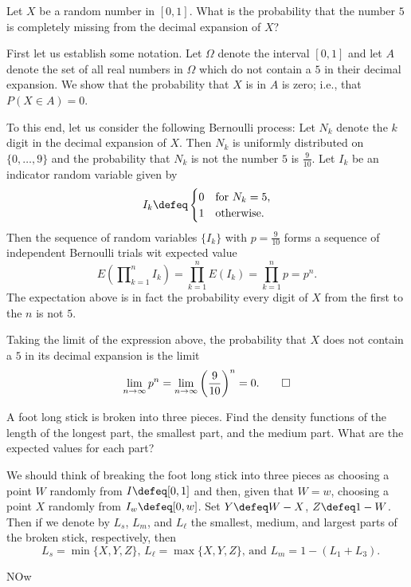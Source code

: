 \begin{problem}[Handout 18, \# 16]
  Let \(X\) be a random number in \([0,1]\). What is the probability that
  the number \(5\) is completely missing from the decimal expansion of
  \(X\)?
\end{problem}
\begin{solution}
  First let us establish some notation. Let \(\Omega\) denote the interval
  \([0,1]\) and let \(A\) denote the set of all real numbers in \(\Omega\)
  which do not contain a \(5\) in their decimal expansion. We show that the
  probability that \(X\) is in \(A\) is zero; i.e., that \(P(X\in A)=0\).

  To this end, let us consider the following Bernoulli process: Let \(N_k\)
  denote the \(k\) digit in the decimal expansion of
  \(X\). Then \(N_k\) is uniformly distributed on \(\{0,\dotsc,9\}\) and
  the probability that \(N_k\) is not the number \(5\) is
  \(\frac{9}{10}\). Let \(I_k\) be an indicator random variable given by
  \[
    I_k\defeq%
    \begin{cases}%
      0&\text{for \(N_k=5\),}\\
      1&\text{otherwise.}
    \end{cases}
  \]
  Then the sequence of random variables \(\{I_k\}\) with \(p=\frac{9}{10}\)
  forms a sequence of independent Bernoulli trials wit expected value
  \[
    E\left(\prod\nolimits_{k=1}^n I_k\right)=%
    \prod_{k=1}^n E(I_k)=%
    \prod_{k=1}^n p=p^n.
  \]
  The expectation above is in fact the probability every digit of \(X\)
  from the first to the \(n\) is not \(5\).

  Taking the limit of the expression above, the probability that \(X\) does
  not contain a \(5\) in its decimal expansion is the limit
  \[
    \lim_{n\to\infty}
    p^n=\lim_{n\to\infty}\left(\frac{9}{10}\right)^n=0.\qedhere
  \]
\end{solution}
\newpage

\begin{problem}[Handout 18, \# 17]
  A foot long stick is broken into three pieces. Find the density functions
  of the length of the longest part, the smallest part, and the medium
  part. What are the expected values for each part?
\end{problem}
\begin{solution}
  We should think of breaking the foot long stick into three pieces as
  choosing a point \(W\) randomly from \(I\defeq [0,1]\) and then, given
  that \(W=w\), choosing a point \(X\) randomly from \(I_w\defeq
  [0,w]\). Set \(Y\defeq W-X\), \(Z\defeq 1-W\). Then if we denote by
  \(L_s\), \(L_m\), and \(L_\ell\) the smallest, medium, and largest parts
  of the broken stick, respectively, then
  \[
    \text{ \(L_s=\min\{X,Y,Z\}\), \(L_\ell=\max\{X,Y,Z\}\), and
      \(L_m=1-(L_1+L_3)\).}
  \]

NOw
\end{solution}

